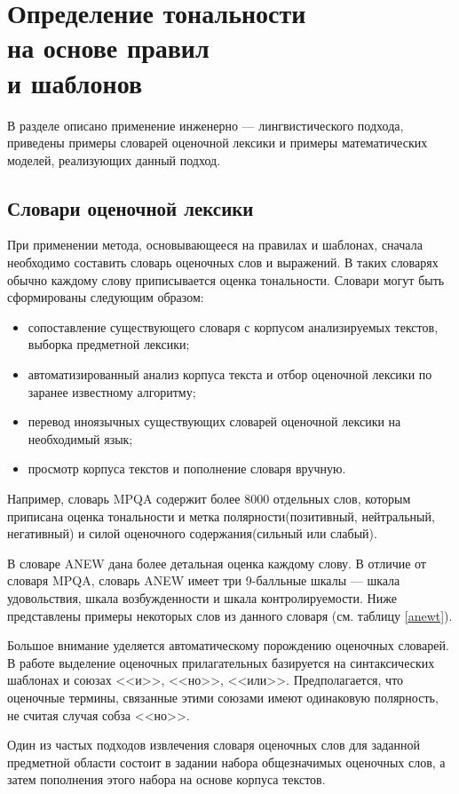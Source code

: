 \chapter[Определение тональности на основе правил и шаблонов]{Определение тональности \\ на основе правил \\и шаблонов}
В разделе описано применение инженерно --- лингвистического подхода, приведены примеры словарей оценочной лексики и примеры математических моделей, реализующих данный подход.
\section{Словари оценочной лексики}
При применении метода, основывающееся на правилах и шаблонах, сначала необходимо составить словарь оценочных слов и выражений. В таких словарях обычно каждому слову приписывается оценка тональности. Словари могут быть сформированы следующим образом:
\begin{itemize}
	\item сопоставление существующего словаря с корпусом анализируемых текстов, выборка предметной лексики;
	\item автоматизированный анализ корпуса текста и отбор оценочной лексики по заранее известному алгоритму;
	\item перевод иноязычных существующих словарей оценочной лексики на необходимый язык;
	\item просмотр корпуса текстов и пополнение словаря вручную.
\end{itemize}

Например, словарь MPQA\cite{mpqa} содержит более 8000 отдельных слов, которым приписана оценка тональности и метка полярности(позитивный, нейтральный, негативный) и силой оценочного содержания(сильный или слабый).

В словаре ANEW дана более детальная оценка каждому слову. В отличие от словаря MPQA, словарь ANEW имеет три 9-балльные шкалы --- шкала удовольствия, шкала возбужденности и шкала контролируемости. Ниже представлены примеры некоторых слов из данного словаря (см. таблицу \ref{anewt}).

Большое внимание уделяется автоматическому порождению оценочных словарей. В работе \cite{auto} выделение оценочных прилагательных базируется на синтаксических шаблонах и союзах <<и>>, <<но>>, <<или>>. Предполагается, что оценочные термины, связанные этими союзами имеют одинаковую полярность, не считая случая собза <<но>>. 

Один из частых подходов извлечения словаря оценочных слов для заданной предметной области состоит в задании набора общезначимых оценочных слов, а затем пополнения этого набора на основе корпуса текстов. 

